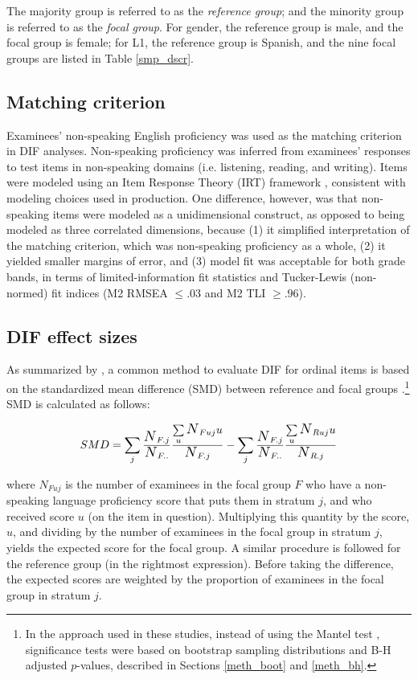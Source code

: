 \documentclass [PhD] {uclathes}
\newcommand{\sbN}{\scalebox{1.25}{$N$}}
\begin{document}
The majority group is referred to as the \emph{reference group}; and the minority group is referred to as the \emph{focal group}. For gender, the reference group is male, and the focal group is female; for L1, the reference group is Spanish, and the nine focal groups are listed in Table \ref{smp_dscr}.

\subsection{Matching criterion}
\label{meth_nonspeaking}

Examinees’ non-speaking English proficiency was used as the matching criterion in DIF analyses. Non-speaking proficiency was inferred from examinees’ responses to test items in non-speaking domains (i.e. listening, reading, and writing). Items were modeled using an Item Response Theory (IRT) framework \citep{cai_item_2016}, consistent with modeling choices used in production. One difference, however, was that non-speaking items were modeled as a unidimensional construct, as opposed to being modeled as three correlated dimensions, because (1) it simplified interpretation of the matching criterion, which was non-speaking proficiency as a whole, (2) it yielded smaller margins of error, and (3) model fit was acceptable for both grade bands, in terms of limited-information fit statistics and Tucker-Lewis (non-normed) fit indices (M2 RMSEA $\leq .03$ and M2 TLI $\geq .96$). 

\subsection{DIF effect sizes}
\label{meth_fx}

As summarized by \cite{michaelides2008}, a common method to evaluate DIF for ordinal items is based on the standardized mean difference (SMD) between reference and focal groups \citep{dorans1986}.\footnote{In the approach used in these studies, instead of using the Mantel test \citep{mantel1963}, significance tests were based on bootstrap sampling distributions and B-H adjusted $p$-values, described in Sections \ref{meth_boot} and \ref{meth_bh}.} SMD is calculated as follows:

$$
SMD = \sum_j{\frac{\sbN_{F.j}}{\sbN_{F..}}}\frac{\sum\limits_u{\sbN_{Fuj}u}}{\sbN_{F.j}} - \sum_j{\frac{\sbN_{F.j}}{\sbN_{F..}}}\frac{\sum\limits_u{\sbN_{Ruj}u}}{\sbN_{R.j}}
$$

where $N_{Fuj}$ is the number of examinees in the focal group $F$ who have a non-speaking language proficiency score that puts them in stratum $j$, and who received score $u$ (on the item in question). Multiplying this quantity by the score, $u$, and dividing by the number of examinees in the focal group in stratum $j$, yields the expected score for the focal group. A similar procedure is followed for the reference group (in the rightmost expression). Before taking the difference, the expected scores are weighted by the proportion of examinees in the focal group in stratum $j$. 
\end{document}

